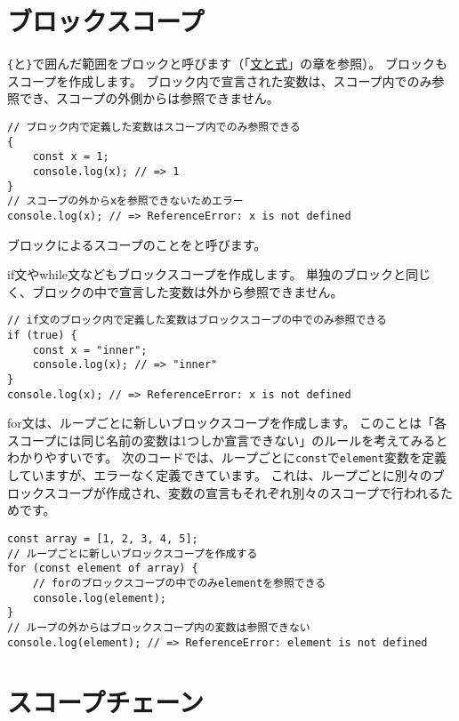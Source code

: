 \hypertarget{block-scope}{%
\section{ブロックスコープ}\label{block-scope}}

\texttt{\{}と\texttt{\}}で囲んだ範囲をブロックと呼びます（「\hyperlink{statement-and-expression}{文と式}」の章を参照）。
ブロックもスコープを作成します。
ブロック内で宣言された変数は、スコープ内でのみ参照でき、スコープの外側からは参照できません。

\begin{lstlisting}
// ブロック内で定義した変数はスコープ内でのみ参照できる
{
    const x = 1;
    console.log(x); // => 1
}
// スコープの外からxを参照できないためエラー
console.log(x); // => ReferenceError: x is not defined
\end{lstlisting}

ブロックによるスコープのことを\textbf{}と呼びます。

if文やwhile文などもブロックスコープを作成します。
単独のブロックと同じく、ブロックの中で宣言した変数は外から参照できません。

\begin{lstlisting}
// if文のブロック内で定義した変数はブロックスコープの中でのみ参照できる
if (true) {
    const x = "inner";
    console.log(x); // => "inner"
}
console.log(x); // => ReferenceError: x is not defined
\end{lstlisting}

for文は、ループごとに新しいブロックスコープを作成します。
このことは「各スコープには同じ名前の変数は1つしか宣言できない」のルールを考えてみるとわかりやすいです。
次のコードでは、ループごとに\texttt{const}で\texttt{element}変数を定義していますが、エラーなく定義できています。
これは、ループごとに別々のブロックスコープが作成され、変数の宣言もそれぞれ別々のスコープで行われるためです。

\begin{lstlisting}
const array = [1, 2, 3, 4, 5];
// ループごとに新しいブロックスコープを作成する
for (const element of array) {
    // forのブロックスコープの中でのみelementを参照できる
    console.log(element);
}
// ループの外からはブロックスコープ内の変数は参照できない
console.log(element); // => ReferenceError: element is not defined
\end{lstlisting}

\hypertarget{scope-chain}{%
\section{スコープチェーン}\label{scope-chain}}

